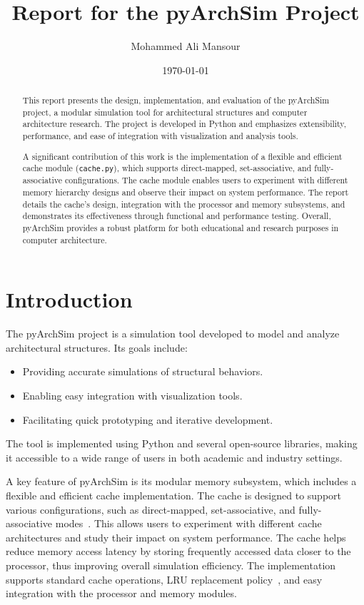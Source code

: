 \documentclass[12pt,a4paper]{report}
\title{Report for the pyArchSim Project}
\author{Mohammed Ali Mansour}
\date{\today}
\begin{document}
\maketitle
\tableofcontents
\newpage

\begin{abstract}
This report presents the design, implementation, and evaluation of the pyArchSim project, a modular simulation tool for architectural structures and computer architecture research. The project is developed in Python and emphasizes extensibility, performance, and ease of integration with visualization and analysis tools. 

A significant contribution of this work is the implementation of a flexible and efficient cache module (\texttt{cache.py}), which supports direct-mapped, set-associative, and fully-associative configurations. The cache module enables users to experiment with different memory hierarchy designs and observe their impact on system performance. The report details the cache's design, integration with the processor and memory subsystems, and demonstrates its effectiveness through functional and performance testing. Overall, pyArchSim provides a robust platform for both educational and research purposes in computer architecture.
\end{abstract}

\renewcommand{\thesection}{\arabic{section}}
\renewcommand{\thesubsection}{\thesection.\arabic{subsection}}

\section{Introduction}
The pyArchSim project is a simulation tool developed to model and analyze architectural structures. Its goals include:
\begin{itemize}
  \item Providing accurate simulations of structural behaviors.
  \item Enabling easy integration with visualization tools.
  \item Facilitating quick prototyping and iterative development.
\end{itemize}

The tool is implemented using Python and several open-source libraries, making it accessible to a wide range of users in both academic and industry settings.

A key feature of pyArchSim is its modular memory subsystem, which includes a flexible and efficient cache implementation. The cache is designed to support various configurations, such as direct-mapped, set-associative, and fully-associative modes~\cite{sciencedirect_set_associative}. This allows users to experiment with different cache architectures and study their impact on system performance. The cache helps reduce memory access latency by storing frequently accessed data closer to the processor, thus improving overall simulation efficiency. The implementation supports standard cache operations, LRU replacement policy~\cite{gfg_lru_cache}, and easy integration with the processor and memory modules.
\end{document}
